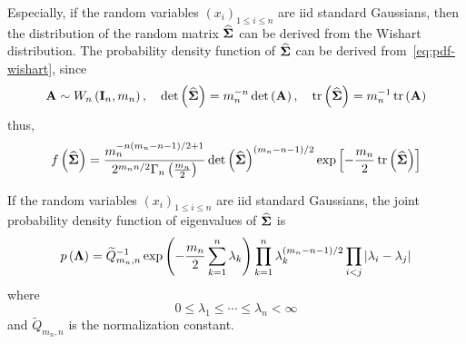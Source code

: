 \begin{remark}
	Especially, if the random variables \(\left(x_{i}\right)_{1\leq i\leq n}\) are iid standard Gaussians, then the distribution of the random matrix \(\widehat{\boldsymbol{\Sigma}}\) can be derived from the Wishart distribution. The probability density function of \(\widehat{\boldsymbol{\Sigma}}\) can be derived from~\eqref{eq:pdf-wishart}, since
	\begin{equation*}
		\mathbf{A}\sim W_{n}\left(\mathbf{I}_{n},m_{n}\right),\quad\det\left(\widehat{\boldsymbol{\Sigma}}\right)=m_{n}^{-n}\det\left(\mathbf{A}\right),\quad\operatorname{tr}\left(\widehat{\boldsymbol{\Sigma}}\right)=m_{n}^{-1}\operatorname{tr}\left(\mathbf{A}\right)
	\end{equation*}
	thus,
	\begin{equation}
		f\left(\widehat{\boldsymbol{\Sigma}}\right)=\frac{m_{n}^{-n(m_{n}-n-1)/2+1}}{2^{m_{n}n/2}\Gamma_{n}\left(\frac{m_{n}}{2}\right)}\det\left(\widehat{\boldsymbol{\Sigma}}\right)^{(m_{n}-n-1)/2}\exp\left[-\frac{m_{n}}{2}\operatorname{tr}\left(\widehat{\boldsymbol{\Sigma}}\right)\right]
	\end{equation}
\end{remark}

\begin{theorem}
	If the random variables \(\left(x_{i}\right)_{1\leq i\leq n}\) are iid standard Gaussians, the joint probability density function of eigenvalues of \(\widehat{\boldsymbol{\Sigma}}\) is
	\begin{equation}
		p\left(\boldsymbol{\Lambda}\right)=\widetilde{Q}_{m_{n},n}^{-1}\exp\left(-\frac{m_{n}}{2}\sum_{k=1}^{n}\lambda_{k}\right)\prod_{k=1}^{n}\lambda_{k}^{(m_{n}-n-1)/2}\prod_{i<j}\left|\lambda_{i}-\lambda_{j}\right|
		\label{eq:jpdf-eigenvalues-sigma}
	\end{equation}
	where
	\begin{equation*}
		0\leq\lambda_{1}\leq\cdots\leq\lambda_{n}<\infty
	\end{equation*}
	and \(\widetilde{Q}_{m_{n},n}\) is the normalization constant.
\end{theorem}

